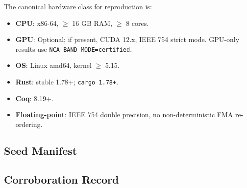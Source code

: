 The canonical hardware class for reproduction is:
\begin{itemize}
  \item \textbf{CPU}: x86-64, $\ge$ 16 GB RAM, $\ge$ 8 cores.
  \item \textbf{GPU}: Optional; if present, CUDA 12.x, IEEE 754
        strict mode.  GPU-only results use
        \texttt{NCA\_BAND\_MODE=certified}.
  \item \textbf{OS}: Linux amd64, kernel $\ge$ 5.15.
  \item \textbf{Rust}: stable 1.78+; \texttt{cargo 1.78+}.
  \item \textbf{Coq}: 8.19+.
  \item \textbf{Floating-point}: IEEE 754 double precision, no
        non-deterministic FMA re-ordering.
\end{itemize}

\subsection{Seed Manifest}

\begin{table}[h]
\centering
\caption{Canonical Seed Manifest — Lucas Closure Chapter}
\label{tab:29-seeds}
\end{table}

\subsection{Corroboration Record}
\label{sec:29-corroboration-record}

